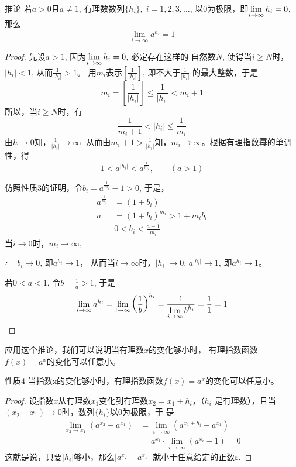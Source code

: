 \begin{blk}{推论}
   若$a>0$且$a\ne 1$, 有理数数列$\{h_i\},\; i=1,2,3,\ldots$,
以0为极限，即$\displaystyle\lim_{i\to\infty}h_i=0$, 那么
\[\lim_{i\to\infty}a^{h_i}=1\]
\end{blk}

\begin{proof}
  先设$a>1$, 因为$\displaystyle\lim_{i\to\infty}h_i=0$, 必定存在这样的
自然数$N$, 使得当$i\ge N$时，$|h_i|<1$, 从而$\frac{1}{|h_i|}>1$。
用$m_i$表示$\left[\frac{1}{|h_i|}\right]$,
即不大于$\frac{1}{|h_i|}$
的最大整数，于是
\begin{equation}
  m_i=\left[\frac{1}{|h_i|}\right]\le \frac{1}{|h_i|}<m_i+1
\end{equation}
所以，当$i\ge N$时，有
\[\frac{1}{m_i+1}<|h_i|\le\frac{1}{m_i}\]
由$h\to 0$知，$\frac{1}{|h_i|}\to \infty$. 从而由$m_i+1>\frac{1}{|h_i|}$知，$m_i\to\infty$。根据有理指数幂的单调性，得
\[1<a^{|h_i|}<a^{\tfrac{1}{m_i}},\qquad (a>1)\]

仿照性质3的证明，令$b_i=a^{\tfrac{1}{m_i}}-1>0$, 于是，
\[\begin{split}
  a^{\tfrac{1}{m_i}}&=(1+b_i)\\
  a&=(1+b_i)^{m_i}>1+m_ib_i\\
  & 0<b_i<\frac{a-1}{m_i}
\end{split}\]
当$i\to 0$时，$m_i\to \infty$,

$\therefore\quad b_i\to 0$, 即$a^{h_i}\to 1$， 从而当$i\to \infty$时，$|h_i|\to 0$, $a^{|h_i|}\to 1$, 即$a^{h_i}\to 1$。

若$0<a<1$, 令$b=\frac{1}{a}>1$, 于是
\[\lim_{i\to \infty} a^{h_i}=\lim_{i\to \infty} \left(\dfrac{1}{b}\right)^{h_i}=\dfrac{1}{\displaystyle\lim_{i\to \infty} b^{h_i}}=\dfrac{1}{1}=1\]
\end{proof}

应用这个推论，我们可以说明当有理数$x$的变化够小时，
有理指数函数$f(x)=a^x$的变化可以任意小。

\begin{blk}{性质4}
   当指数x的变化够小时，有理指数函数$f(x)=
a^x$的变化可以任意小。
\end{blk}

\begin{proof}
  设指数$x$从有理数$x_1$变化到有理数$x_2=x_1+h_i$，（$h_i$
是有理数），且当$(x_2-x_1)\to 0$时，数列$\{h_i\}$以0为极限，于
是
\[\begin{split}
  \lim_{x_2\to x_1}\left(a^{x_2}-a^{x_1}\right)&=\lim_{i\to \infty}\left(a^{x_1+h_i}-a^{x_1}\right)\\
  &=a^{x_1}\cdot \lim_{i\to \infty}\left(a^{x_i}-1\right)=0
\end{split}\]
这就是说，只要$|h_i|$够小，那么$|a^{x_2}-a^{x_1}|$
就小于任意给定的正数$\varepsilon$.
\end{proof}


